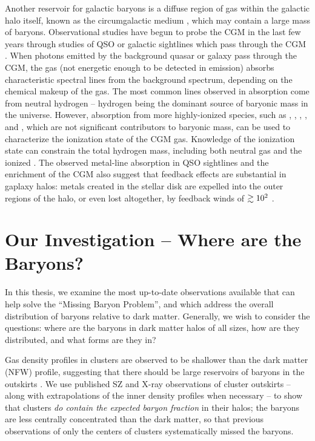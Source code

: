 Another reservoir for galactic baryons is a diffuse region of gas
within the galactic halo itself, known as the circumgalactic medium
\citep[CGM][]{Bahcall1969, Bergeron1985, Lanzetta1995}, which may
contain a large mass of baryons. Observational studies have begun to
probe the CGM in the last few years through studies of QSO or galactic
sightlines which pass through the CGM \citep{Steidel2010,
  Prochaska2011, Tumlinson2011, Werk2013}. When photons emitted by the
background quasar or galaxy pass through the CGM, the gas (not
energetic enough to be detected in emission) absorbs characteristic
spectral lines from the background spectrum, depending on the chemical
makeup of the gas. The most common lines observed in absorption come
from neutral hydrogen -- hydrogen being the dominant source of
baryonic mass in the universe. However, absorption from more
highly-ionized species, such as  \citep{Zhu2013},
, , , and 
\citep{Tumlinson2011, Werk2014}, which are not significant
contributors to baryonic mass, can be used to characterize the
ionization state of the CGM gas. Knowledge of the ionization state can
constrain the total hydrogen mass, including both neutral 
gas and the ionized . The observed metal-line absorption in
QSO sightlines and the enrichment of the CGM also suggest that
feedback effects are substantial in gaplaxy halos: metals created in
the stellar disk are expelled into the outer regions of the halo, or
even lost altogether, by feedback winds of $\gtrsim 10^2$ \kms{}
\citep{D'Odorico1991, Chen2010, Oppenheimer2012, Booth2012}.

\section{Our Investigation -- Where are the Baryons?}
\label{sec:investigation}

In this thesis, we examine the most up-to-date observations available
that can help solve the ``Missing Baryon Problem'', and which address
the overall distribution of baryons relative to dark
matter. Generally, we wish to consider the questions: where are the
baryons in dark matter halos of all sizes, how are they distributed,
and what forms are they in? 

Gas density profiles in clusters are observed to be shallower than the
dark matter (NFW) profile, suggesting that there should be large
reservoirs of baryons in the outskirts . We use
published SZ and X-ray observations of cluster outskirts -- along with
extrapolations of the inner density profiles when necessary -- to show
that clusters \textit{do contain the expected baryon fraction} in
their halos; the baryons are less centrally concentrated than the dark
matter, so that previous observations of only the centers of clusters
systematically missed the baryons.

